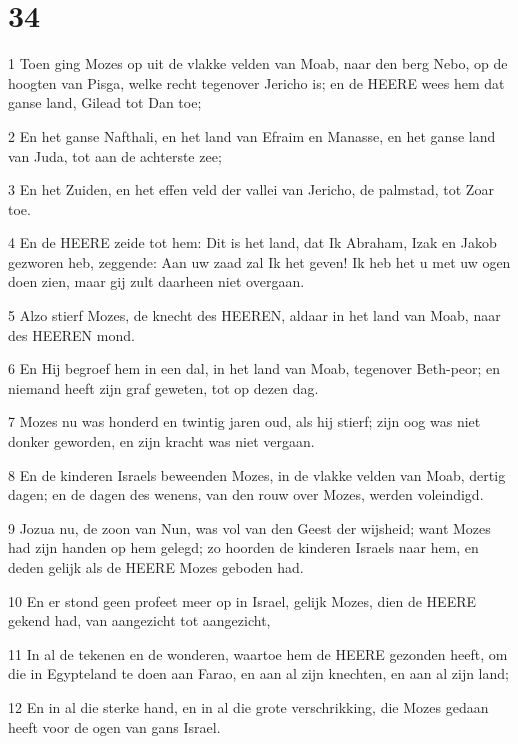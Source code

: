 \chapter{34}

\par 1 Toen ging Mozes op uit de vlakke velden van Moab, naar den berg Nebo, op de hoogten van Pisga, welke recht tegenover Jericho is; en de HEERE wees hem dat ganse land, Gilead tot Dan toe;
\par 2 En het ganse Nafthali, en het land van Efraim en Manasse, en het ganse land van Juda, tot aan de achterste zee;
\par 3 En het Zuiden, en het effen veld der vallei van Jericho, de palmstad, tot Zoar toe.
\par 4 En de HEERE zeide tot hem: Dit is het land, dat Ik Abraham, Izak en Jakob gezworen heb, zeggende: Aan uw zaad zal Ik het geven! Ik heb het u met uw ogen doen zien, maar gij zult daarheen niet overgaan.
\par 5 Alzo stierf Mozes, de knecht des HEEREN, aldaar in het land van Moab, naar des HEEREN mond.
\par 6 En Hij begroef hem in een dal, in het land van Moab, tegenover Beth-peor; en niemand heeft zijn graf geweten, tot op dezen dag.
\par 7 Mozes nu was honderd en twintig jaren oud, als hij stierf; zijn oog was niet donker geworden, en zijn kracht was niet vergaan.
\par 8 En de kinderen Israels beweenden Mozes, in de vlakke velden van Moab, dertig dagen; en de dagen des wenens, van den rouw over Mozes, werden voleindigd.
\par 9 Jozua nu, de zoon van Nun, was vol van den Geest der wijsheid; want Mozes had zijn handen op hem gelegd; zo hoorden de kinderen Israels naar hem, en deden gelijk als de HEERE Mozes geboden had.
\par 10 En er stond geen profeet meer op in Israel, gelijk Mozes, dien de HEERE gekend had, van aangezicht tot aangezicht,
\par 11 In al de tekenen en de wonderen, waartoe hem de HEERE gezonden heeft, om die in Egypteland te doen aan Farao, en aan al zijn knechten, en aan al zijn land;
\par 12 En in al die sterke hand, en in al die grote verschrikking, die Mozes gedaan heeft voor de ogen van gans Israel.




